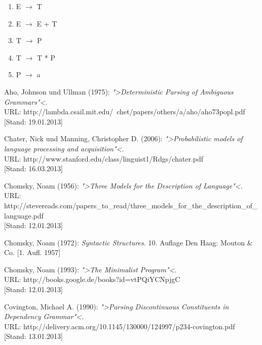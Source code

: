 \documentclass[12pt,a4paper]{article}
\theoremstyle{definition}
\begin{document}
			\begin{enumerate}[label={(\arabic*)}]
				\item{E $\rightarrow$ T}
				\item{E $\rightarrow$ E + T}
				\item{T $\rightarrow$ P}
				\item{T $\rightarrow$ T * P}
				\item{P $\rightarrow$ a}
			\end{enumerate}

\newpage
	
\begin{thebibliography}{99}
	
	\thispagestyle{empty}
	\raggedright
	
		Aho, Johnson und Ullman (1975):
		\emph{">Deterministic Parsing of Ambiguous Grammars"<}.\\
		URL: http://lambda.csail.mit.edu/~chet/papers/others/a/aho/aho73popl.pdf \\
		{[Stand: 19.01.2013]}
	
		Chater, Nick und Manning, Christopher D. (2006):
		\emph{">Probabilistic models of language processing and acquisition"<}.\\
		URL: http://www.stanford.edu/class/linguist1/Rdgs/chater.pdf\\
		{[Stand: 16.03.2013]}
	
		Chomsky, Noam (1956):
		\emph{">Three Models for the Description of Language"<}.\\
		URL: http://stevereads.com/papers\_to\_read/three\_models\_for\_the\_description\_of\_language.pdf\\
		{[Stand: 12.01.2013]}

		Chomsky, Noam (1972):
		\emph{Syntactic Structures.}
		10. Auflage
		Den Haag: Mouton \& Co. [1. Aufl. 1957]

		Chomsky, Noam (1993):
		\emph{">The Minimalist Program"<}.\\
		URL: http://books.google.de/books?id=vtPQiYCNpjgC\\
		{[Stand: 12.01.2013]}

		Covington, Michael A. (1990):
		\emph{">Parsing Discontinuous Constituents in Dependency Grammar"<}.\\
		URL: http://delivery.acm.org/10.1145/130000/124997/p234-covington.pdf\\
		{[Stand: 13.01.2013]}


\end{thebibliography}
\end{document}
